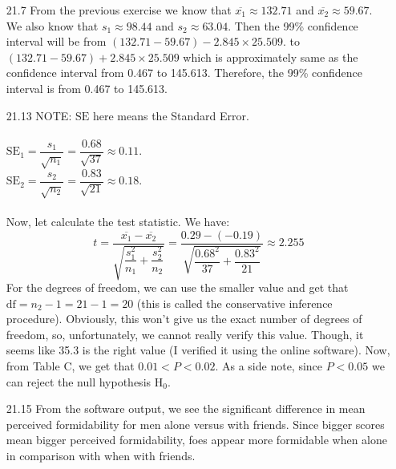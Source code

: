 \documentclass[11pt, a4paper]{article}
\begin{document}
\begin{itemize}
\item[]
\item[]

\item[21.7]
From the previous exercise we know that $\overline{x_1} \approx 132.71$ and $\overline{x_2} \approx 59.67$.
We also know that $s_1 \approx 98.44$ and $s_2 \approx 63.04$.
Then the 99\% confidence interval will be from $(132.71 - 59.67) - 2.845 \times 25.509$.
to $(132.71 - 59.67) + 2.845 \times 25.509$ which is approximately same
as the confidence interval from 0.467 to 145.613. Therefore, the 99\% confidence
interval is from 0.467 to 145.613.

\item[]
\item[]

\item[21.13]
NOTE: $\text{SE}$ here means the Standard Error.\\\\
$\text{SE}_1 = \dfrac{s_1}{\sqrt{n_1}} = \dfrac{0.68}{\sqrt{37}} \approx 0.11$.\\
$\text{SE}_2 = \dfrac{s_2}{\sqrt{n_2}} = \dfrac{0.83}{\sqrt{21}} \approx 0.18$.\\\\
Now, let calculate the test statistic. We have:
$$t = \dfrac{\overline{x_1} - \overline{x_2}}{\sqrt{\dfrac{s_1^2}{n_1} + \dfrac{s_2^2}{n_2}}} = \dfrac{0.29 - (-0.19)}{\sqrt{\dfrac{0.68^2}{37} + \dfrac{0.83^2}{21}}} \approx 2.255$$
For the degrees of freedom, we can use the smaller value and get that $\text{df} = n_2 - 1 = 21 - 1 = 20$ (this is called the conservative inference procedure).
Obviously, this won't give us the exact number of degrees of freedom, so, unfortunately, we cannot really verify this value. Though, it seems like
35.3 is the right value (I verified it using the online software). Now, from Table C, we get that $0.01 < P < 0.02$.
As a side note, since $P < 0.05$ we can reject the null hypothesis $\text{H}_0$.
\item[]
\item[]

\item[21.15]
From the software output, we see the significant difference in mean perceived formidability for men alone
versus with friends. Since bigger scores mean bigger perceived formidability, foes appear
more formidable when alone in comparison with when with friends.

\item[]
\item[]


\end{itemize}
\end{document}
